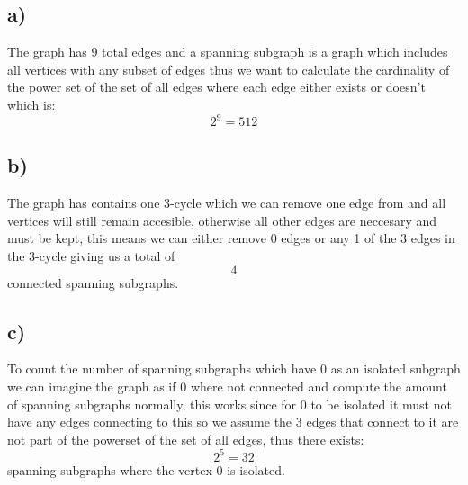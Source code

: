 \documentclass{article}
\begin{document}
\subsection*{a)}
The graph has 9 total edges and a spanning subgraph is a graph which includes all vertices with any subset of edges thus we want to calculate the cardinality of the power set of the set of all edges where each edge either exists or doesn't which is: $$2^{9} = 512$$

\subsection*{b)}
The graph has contains one 3-cycle which we can remove one edge from and all vertices will still remain accesible, otherwise all other edges are neccesary and must be kept, this means we can either remove 0 edges or any 1 of the 3 edges in the 3-cycle giving us a total of $$4$$connected spanning subgraphs.

\subsection*{c)}
To count the number of spanning subgraphs which have $0$ as an isolated subgraph we can imagine the graph as if $0$ where not connected and compute the amount of spanning subgraphs normally, this works since for $0$ to be isolated it must not have any edges connecting to this so we assume the 3 edges that connect to it are not part of the powerset of the set of all edges, thus there exists: $$2^{5}=32$$spanning subgraphs where the vertex $0$ is isolated. 
\end{document}
